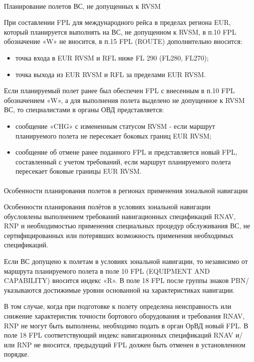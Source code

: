 \paragraph{} Планирование полетов ВС, не допущенных к RVSM

При составлении FPL для международного рейса в пределах региона EUR, который планируется выполнять на ВС, не допущенном к RVSM, в п.10 FPL обозначение «W» не вносится, в п.15 FPL (ROUTE) дополнительно вносится: 
\begin{itemize}
    \item точка входа в EUR RVSM и RFL ниже FL 290 (FL280, FL270);
    \item точка выхода из EUR RVSM и RFL за пределами EUR RVSM.
\end{itemize}
	
Если планируемый полет ранее был обеспечен FPL с внесенным в п.10 FPL обозначением «W», а для выполнения полета выделено не допущенное к RVSM ВС, то специалистами в органы ОВД представляется: 
\begin{itemize}
    \item сообщение «CHG» с измененным статусом RVSM - если маршрут планируемого полета не пересекает боковых границ EUR RVSM; 
    \item сообщение об отмене ранее поданного FPL и представляется новый FPL, составленный с учетом требований, если маршрут планируемого полета пересекает боковые границы EUR RVSM.
\end{itemize}
	 
\paragraph{} Особенности планирования полетов в регионах применения зональной навигации

Особенности планирования полётов в условиях зональной навигации обусловлены выполнением требований навигационных спецификаций RNAV, RNP и необходимостью применения специальных процедур обслуживания ВС, не сертифицированных или потерявших возможность применения необходимых спецификаций.

Если ВС допущено к полетам в условиях зональной навигации, то независимо от маршрута планируемого полета в поле 10 FPL (EQUIPMENT AND CAPABILITY) вносится индекс «R». В поле 18 FPL после группы знаков PBN/ указываются достижимые уровни основанной на характеристиках навигации.

В том случае, когда при подготовке к полету определена неисправность или снижение характеристик точности бортового оборудования и требования RNAV, RNP не могут быть выполнены, необходимо подать в орган ОрВД новый FPL. В поле 18 FPL соответствующий индекс навигационных спецификаций RNAV и/или RNP не вносится, предыдущий FPL должен быть отменен в установленном порядке.

